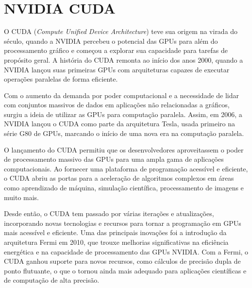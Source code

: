 \documentclass[12pt, %
openright, 
oneside, %
a4paper,    %
brazil]{facom-ufu-abntex2}
\begin{document}

\section{NVIDIA CUDA}




O CUDA (\textit{Compute Unified Device Architecture}) teve sua origem na virada do século, quando a NVIDIA percebeu o potencial das GPUs para além do processamento gráfico e começou a explorar sua capacidade para tarefas de propósito geral. A história do CUDA remonta ao início dos anos 2000, quando a NVIDIA lançou suas primeiras GPUs com arquiteturas capazes de executar operações paralelas de forma eficiente.


Com o aumento da demanda por poder computacional e a necessidade de lidar com conjuntos massivos de dados em aplicações não relacionadas a gráficos, surgiu a ideia de utilizar as GPUs para computação paralela. Assim, em 2006, a NVIDIA lançou o CUDA como parte da arquitetura Tesla, usada primeiro na série G80 de GPUs, marcando o início de uma nova era na computação paralela.

O lançamento do CUDA permitiu que os desenvolvedores aproveitassem o poder de processamento massivo das GPUs para uma ampla gama de aplicações computacionais. Ao fornecer uma plataforma de programação acessível e eficiente, o CUDA abriu as portas para a aceleração de algoritmos complexos em áreas como aprendizado de máquina, simulação científica, processamento de imagens e muito mais.

Desde então, o CUDA tem passado por várias iterações e atualizações, incorporando novas tecnologias e recursos para tornar a programação em GPUs mais acessível e eficiente. Uma das principais inovações foi a introdução da arquitetura Fermi em 2010, que trouxe melhorias significativas na eficiência energética e na capacidade de processamento das GPUs NVIDIA. Com a Fermi, o CUDA ganhou suporte para novos recursos, como cálculos de precisão dupla de ponto flutuante, o que o tornou ainda mais adequado para aplicações científicas e de computação de alta precisão.
\end{document}
